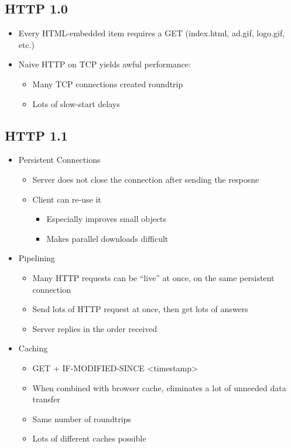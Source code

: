 \subsection{HTTP 1.0}
\begin{itemize}
	\item Every HTML-embedded item requires a GET (index.html, ad.gif, logo.gif, etc.)
	\item Naive HTTP on TCP yields awful performance:
	\begin{itemize}
		\item Many TCP connections created roundtrip
		\item Lots of slow-start delays
	\end{itemize}
\end{itemize}

\subsection{HTTP 1.1}
\begin{itemize}
	\item Persistent Connections
	\begin{itemize}
		\item Server does not close the connection after sending the resposne
		\item Client can re-use it
		\begin{itemize}
			\item Especially improves small objects
			\item Makes parallel downloads difficult
		\end{itemize}
	\end{itemize}
	\item Pipelining
	\begin{itemize}
		\item Many HTTP requests can be ``live'' at once, on the same persistent connection
		\item Send lots of HTTP request at once, then get lots of answers
		\item Server replies in the order received
	\end{itemize}
	\item Caching
	\begin{itemize}
		\item GET + IF-MODIFIED-SINCE <timestamp>
		\item When combined with browser cache, eliminates a lot of unneeded data transfer
		\item Same number of roundtrips
		\item Lots of different caches possible
	\end{itemize}
\end{itemize}